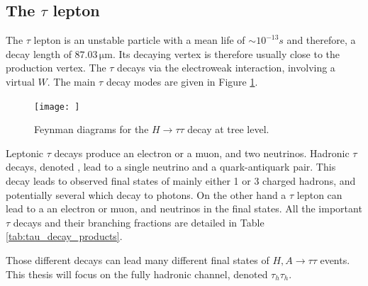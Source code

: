 \subsection{The $\tau$ lepton}
\label{sec:tau_lepton}
The $\tau$ lepton is an unstable particle with a mean life of $\sim 10^{-13} s$ \cite{pdg2016} and therefore, a decay length of $87.03\, \mathrm{\mu m}$. Its decaying vertex is therefore usually close to the production vertex. The $\tau$ decays via the electroweak interaction, involving a virtual $W$. The main $\tau$ decay modes are given in Figure \ref{fig:htt}.

\begin{figure}
    \centering
    \texttt{[image: ]}
    \caption{Feynman diagrams for the $H \rightarrow \tau\tau$ decay at tree level.}
    \label{fig:htt}
\end{figure}

Leptonic $\tau$ decays produce an electron or a muon, and two neutrinos. Hadronic $\tau$ decays, denoted \tauh, lead to a single neutrino and a quark-antiquark pair. This decay leads to observed final states of mainly either 1 or 3 charged hadrons, and potentially several \pizero which decay to photons. On the other hand a $\tau$ lepton can lead to a an electron or muon, and neutrinos in the final states. All the important $\tau$ decays and their branching fractions are detailed in Table \ref{tab:tau_decay_products}. 

Those different decays can lead many different final states of $H,A \rightarrow \tau\tau$ events. This thesis will focus on the fully hadronic channel, denoted $\tau_h \tau_h$.


